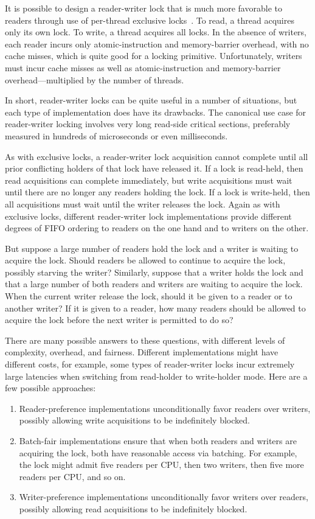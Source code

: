 It is possible to design a reader-writer lock that is much more
favorable to readers through use of per-thread exclusive
locks~\cite{WilsonCHsieh92a}.
To read, a thread acquires only its own lock.
To write, a thread acquires all locks.
In the absence of writers, each reader incurs only atomic-instruction
and memory-barrier overhead, with no cache misses, which is quite
good for a locking primitive.
Unfortunately, writers must incur cache misses as well as atomic-instruction
and memory-barrier overhead---multiplied by the number of threads.

In short, reader-writer locks can be quite useful in a number of
situations, but each type of implementation does have its drawbacks.
The canonical use case for reader-writer locking involves very long
read-side critical sections, preferably measured in hundreds of microseconds
or even milliseconds.

As with exclusive locks, a reader-writer lock acquisition cannot complete
until all prior conflicting holders of that lock have released it.
If a lock is read-held, then read acquisitions can complete immediately,
but write acquisitions must wait until there are no longer any readers
holding the lock.
If a lock is write-held, then all acquisitions must wait until the writer
releases the lock.
Again as with exclusive locks, different reader-writer lock implementations
provide different degrees of FIFO ordering to readers on the one hand
and to writers on the other.

But suppose a large number of readers hold the lock and a writer is waiting
to acquire the lock.
Should readers be allowed to continue to acquire the lock, possibly
starving the writer?
Similarly, suppose that a writer holds the lock and that a large number
of both readers and writers are waiting to acquire the lock.
When the current writer release the lock, should it be given to a reader
or to another writer?
If it is given to a reader, how many readers should be allowed to acquire
the lock before the next writer is permitted to do so?

There are many possible answers to these questions, with different
levels of complexity, overhead, and fairness.
Different implementations might have different costs, for example,
some types of reader-writer locks incur extremely large latencies
when switching from read-holder to write-holder mode.
Here are a few possible approaches:

\begin{enumerate}
\item	
	Reader-preference implementations unconditionally favor readers
	over writers, possibly allowing write acquisitions to be
	indefinitely blocked.
\item	Batch-fair implementations ensure that when both readers and writers
	are acquiring the lock, both have reasonable access via batching.
	For example, the lock might admit five readers per CPU, then two
	writers, then five more readers per CPU, and so on.
\item	Writer-preference implementations unconditionally favor
	writers over readers, possibly allowing read acquisitions to be
	indefinitely blocked.
\end{enumerate}

